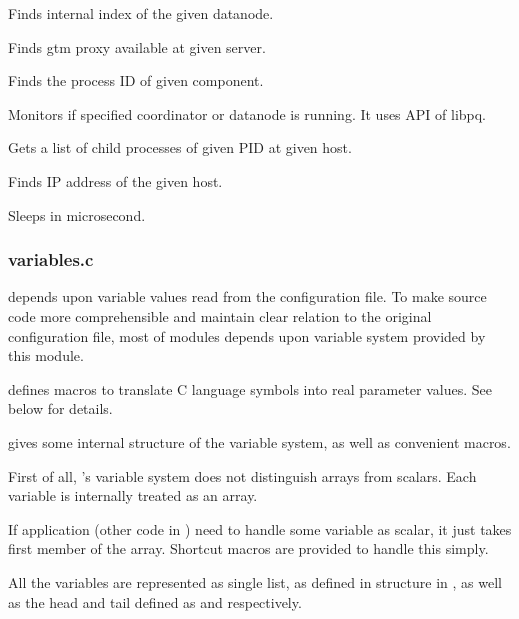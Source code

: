  
      Finds internal index of the given datanode.
  
  
      Finds gtm proxy available at given server.
  
  
      Finds the process ID of given component.
  
  
      Monitors if specified coordinator or datanode is running.
      It uses  API of libpq.
  
  
      Gets a list of child processes of given PID at given host.
  
  
      Finds IP address of the given host.
  
  
      Sleeps in microsecond.



\subsubsection{variables.c}

   depends upon  variable values read from the configuration file.
  To make source code more comprehensible and maintain clear relation to the original
  configuration file, most of  modules depends upon variable system
  provided by this module.
  
   defines macros to translate C language symbols into real parameter values.
  See below for details.
  
   gives some internal structure of the variable system, as well as
  convenient macros.
  
  First of all, 's variable system does not distinguish arrays from scalars.
  Each variable is internally treated as an array.
  
  If application (other code in ) need to handle some variable as scalar, it
  just takes first member of the array.
  Shortcut macros are provided to handle this simply.
  
  All the variables are represented as single list, as defined in  structure
  in , as well as the head and tail defined as  and 
  respectively.
  
